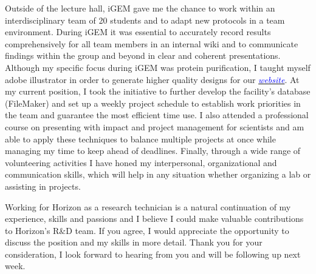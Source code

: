 \documentclass[11pt,a4paper,sans]{moderncv}
\begin{document}
\begin{spacing}{1.15}
Outside of the lecture hall, iGEM gave me the chance to work within an interdisciplinary team of 20 students and to adapt new protocols in a team environment. During iGEM it was essential to accurately record results comprehensively for all team members in an internal wiki and to communicate findings within the group and beyond in clear and coherent presentations. Although my specific focus during iGEM was protein purification, I taught myself adobe illustrator in order to generate higher quality designs for our {\href{http://2015.igem.org/Team:Freiburg}{\textcolor{blue}{\textit{website}}}}. At my current position, I took the initiative to further develop the facility's database (FileMaker) and set up a weekly project schedule to establish work priorities in the team and guarantee the most efficient time use. I also attended a professional course on presenting with impact and project management for scientists and am able to apply these techniques to balance multiple projects at once while managing my time to keep ahead of deadlines. Finally, through a wide range of volunteering activities I have honed my interpersonal, organizational and communication skills, which will help in any situation whether organizing a lab or assisting in projects.\par\vspace*{2mm}

Working for Horizon as a research technician is a natural continuation of my experience, skills and passions and I believe I could make valuable contributions to Horizon's R\&D team. If you agree, I would appreciate the opportunity to discuss the position and my skills in more detail. Thank you for your consideration, I look forward to hearing from you and will be following up next week.

\end{spacing}
\vspace*{2mm} 
\makeletterclosing
\end{document}
